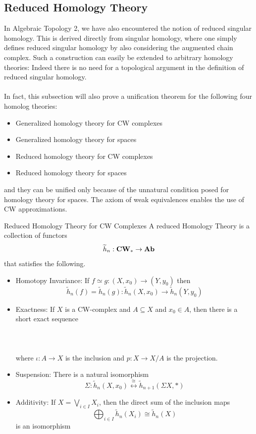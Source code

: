 \documentclass[a4paper]{article}
\begin{document}
\subsection{Reduced Homology Theory}
In Algebraic Topology 2, we have also encountered the notion of reduced singular homology. This is derived directly from singular homology, where one simply defines reduced singular homology by also considering the augmented chain complex. Such a construction can easily be extended to arbitrary homology theories: Indeed there is no need for a topological argument in the definition of reduced singular homology. \\~\\

In fact, this subsection will also prove a unification theorem for the following four homolog theories: 
\begin{itemize}
\item Generalized homology theory for CW complexes
\item Generalized homology theory for spaces
\item Reduced homology theory for CW complexes
\item Reduced homology theory for spaces
\end{itemize}

and they can be unified only because of the unnatural condition posed for homology theory for spaces. The axiom of weak equivalences enables the use of CW approximations. 

\begin{defn}{Reduced Homology Theory for CW Complexes}{} A reduced Homology Theory is a collection of functors $$\widetilde{h}_n:\bold{CW}_\ast\to\bold{Ab}$$ that satisfies the following. 
\begin{itemize}
\item Homotopy Invariance: If $f\simeq g:(X,x_0)\to(Y,y_0)$ then $$\widetilde{h}_n(f)=\widetilde{h}_n(g):\widetilde{h}_n(X,x_0)\to\widetilde{h}_n(Y,y_0)$$
\item Exactness: If $X$ is a CW-complex and $A\subseteq X$ and $x_0\in A$, then there is a short exact sequence \\~\\
\\~\\
where $\iota:A\to X$ is the inclusion and $p:X\to X/A$ is the projection. 

\item Suspension: There is a natural isomorphism $$\Sigma:\widetilde{h}_n(X,x_0)\overset{\cong}{\longleftrightarrow}\widetilde{h}_{n+1}(\Sigma X,\ast)$$

\item Additivity: If $X=\bigvee_{i\in I}X_i$, then the direct sum of the inclusion maps $$\bigoplus_{i\in I}\widetilde{h}_n(X_i)\cong\widetilde{h}_n(X)$$ is an isomorphism
\end{itemize}
\end{defn}
\end{document}
